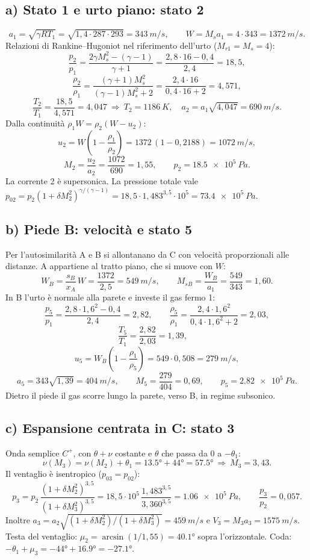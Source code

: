 \documentclass[11pt,a4paper]{article}
\newcommand{\Ms}{M_{s}}
\newcommand{\Cp}{C^{+}}
\begin{document}
\subsection*{a) Stato 1 e urto piano: stato 2}
\[
a_1=\sqrt{\gamma R T_1}=\sqrt{1{,}4\cdot287\cdot293}=\SI{343}{m/s},\qquad W=\Ms a_1=4\cdot343=\SI{1372}{m/s}.
\]
Relazioni di Rankine--Hugoniot nel riferimento dell'urto ($M_{r1}=\Ms=4$):
\[
\frac{p_2}{p_1}=\frac{2\gamma\Ms^2-(\gamma-1)}{\gamma+1}=\frac{2{,}8\cdot16-0{,}4}{2{,}4}=18{,}5,
\]
\[
\frac{\rho_2}{\rho_1}=\frac{(\gamma+1)\Ms^2}{(\gamma-1)\Ms^2+2}=\frac{2{,}4\cdot16}{0{,}4\cdot16+2}=4{,}571,
\]
\[
\frac{T_2}{T_1}=\frac{18{,}5}{4{,}571}=4{,}047\ \Rightarrow\ T_2=\SI{1186}{K},\quad
a_2=a_1\sqrt{4{,}047}=\SI{690}{m/s}.
\]
Dalla continuità $\rho_1W=\rho_2(W-u_2)$:
\[
u_2=W\left(1-\frac{\rho_1}{\rho_2}\right)=1372\,(1-0{,}2188)=\SI{1072}{m/s},
\]
\[
M_2=\frac{u_2}{a_2}=\frac{1072}{690}=1{,}55,\qquad p_2=\SI{18.5e5}{Pa}.
\]
La corrente 2 è supersonica. La pressione totale vale
$p_{02}=p_2(1+\delta M_2^2)^{\gamma/(\gamma-1)}=18{,}5\cdot1{,}483^{3{,}5}\cdot10^5=\SI{73.4e5}{Pa}$.

\subsection*{b) Piede B: velocità e stato 5}
Per l'autosimilarità A e B si allontanano da C con velocità proporzionali alle distanze. A appartiene al tratto
piano, che si muove con $W$:
\[
W_B=\frac{s_B}{x_A}\,W=\frac{1372}{2{,}5}=\SI{549}{m/s},\qquad M_{sB}=\frac{W_B}{a_1}=\frac{549}{343}=1{,}60.
\]
In B l'urto è normale alla parete e investe il gas fermo 1:
\[
\frac{p_5}{p_1}=\frac{2{,}8\cdot1{,}6^2-0{,}4}{2{,}4}=2{,}82,\qquad
\frac{\rho_5}{\rho_1}=\frac{2{,}4\cdot1{,}6^2}{0{,}4\cdot1{,}6^2+2}=2{,}03,
\]
\[
\frac{T_5}{T_1}=\frac{2{,}82}{2{,}03}=1{,}39,\quad
\]
\[
u_5=W_B\left(1-\frac{\rho_1}{\rho_5}\right)=549\cdot0{,}508=\SI{279}{m/s},
\]
\[
a_5=343\sqrt{1{,}39}=\SI{404}{m/s},\qquad M_5=\frac{279}{404}=0{,}69,\qquad p_5=\SI{2.82e5}{Pa}.
\]
Dietro il piede il gas scorre lungo la parete, verso B, in regime subsonico.

\subsection*{c) Espansione centrata in C: stato 3}
Onda semplice $\Cp$, con $\theta+\nu$ costante e $\theta$ che passa da 0 a $-\theta_1$:
\[
\nu(M_3)=\nu(M_2)+\theta_1=\ang{13.5}+\ang{44}=\ang{57.5}\ \Rightarrow\ M_3=3{,}43.
\]
Il ventaglio è isentropico ($p_{03}=p_{02}$):
\[
p_3=p_2\,\frac{(1+\delta M_2^2)^{3{,}5}}{(1+\delta M_3^2)^{3{,}5}}
=18{,}5\cdot10^5\,\frac{1{,}483^{3{,}5}}{3{,}360^{3{,}5}}=\SI{1.06e5}{Pa},\qquad
\frac{p_3}{p_2}=0{,}057.
\]
Inoltre $a_3=a_2\sqrt{(1+\delta M_2^2)/(1+\delta M_3^2)}=\SI{459}{m/s}$ e $V_3=M_3a_3=\SI{1575}{m/s}$.
Testa del ventaglio: $\mu_2=\arcsin(1/1{,}55)=\ang{40.1}$ sopra l'orizzontale. Coda:
$-\theta_1+\mu_3=-\ang{44}+\ang{16.9}=\ang{-27.1}$.
\end{document}
